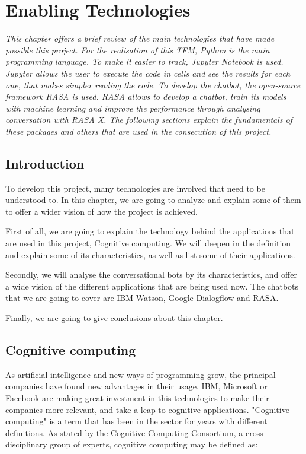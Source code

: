 \chapter{Enabling Technologies}
\label{chap:enabling_technologies}

\textit{This  chapter  offers  a  brief  review  of  the  main  technologies  that  have  made  possible this  project. For the realisation of this TFM, Python is the main programming language. To make it easier to track, Jupyter Notebook is used. Jupyter allows the user to execute the code in cells and see the results for each one, that makes simpler reading the code.
To develop the chatbot, the open-source framework RASA is used. RASA allows to develop a chatbot, train its models with machine learning and improve the performance through analysing conversation with RASA X. The following sections explain the fundamentals of these packages and others that are used in the consecution of this project.}
\clearpage

\section{Introduction}
To develop this project, many technologies are involved that need to be understood to. In this chapter, we are going to analyze and explain some of them to offer a wider vision of how the project is achieved. 

First of all, we are going to explain the technology behind the applications that are used in this project, Cognitive computing. We will deepen in the definition and explain some of its characteristics, as well as list some of their applications.

Secondly, we will analyse the conversational bots by its characteristics, and offer a wide vision of the different applications that are being used now. The chatbots that we are going to cover are IBM Watson, Google Dialogflow and RASA.

Finally, we are going to give conclusions about this chapter.

\section{Cognitive computing}

As artificial intelligence and new ways of programming grow, the principal companies have found new advantages in their usage. IBM, Microsoft or Facebook are making great investment in this technologies to make their companies more relevant, and take a leap to cognitive applications. "Cognitive computing" is a term that has been in the sector for years with different definitions. As stated by the Cognitive Computing Consortium\cite{cognitive_definition}, a cross disciplinary group of experts, cognitive computing may be defined as:

